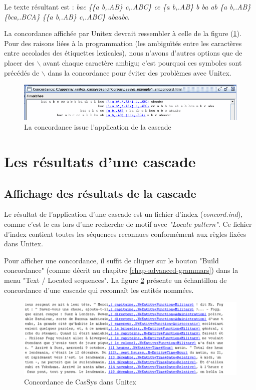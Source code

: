 \bigskip
\noindent Le texte résultant est : \emph{bac \{\{a b,.AB\} c,.ABC\} cc \{a b,.AB\} b ba ab \{a
b,.AB\} \{bca,.BCA\} \{\{a b,.AB\} c,.ABC\} abaabc}.


\bigskip
\noindent La concordance affichée par Unitex devrait ressembler à celle de la figure
(\ref{fig13-07}). Pour des raisons liées à la programmation (les ambiguïtés entre les
	caractères entre accolades des étiquettes lexicales), nous n'avons d'autres options que de
placer des  $\backslash$ avant chaque caractère ambigu; c'est pourquoi ces symboles sont précédés de
$\backslash$ dans la concordance pour éviter des problèmes avec Unitex.

\begin{figure}[!htb]
  \centering
  \includegraphics[width=15cm]{resources/img/fig13-07.png}
  \caption{La concordance issue l'application de la cascade}
  \label{fig13-07}
\end{figure}



\section{Les résultats d'une cascade}

\subsection{Affichage des résultats de la cascade}
\label{subsec:resultsCascade}

Le résultat de l'application d'une cascade est un fichier d'index (\textit{concord.ind}), comme c'est le cas
lors d'une recherche de motif avec \textit{"Locate pattern"}. Ce fichier d'index contient toutes les séquences
reconnues conformément aux règles fixées dans Unitex.

\bigskip
\noindent Pour afficher une concordance, il suffit de cliquer sur le bouton "Build concordance"
(comme décrit au chapitre \ref{chap-advanced-grammars}) dans la menu "Text / Located sequences".
La figure \ref{fig13-04} présente un échantillon de concordance d'une cascade qui reconnaît les entités
nommées.


\begin{figure}[!htb]
  \centering
  \includegraphics[width=14cm]{resources/img/fig13-04.png}
  \caption{Concordance de CasSys dans Unitex}
  \label{fig13-04}
\end{figure}

